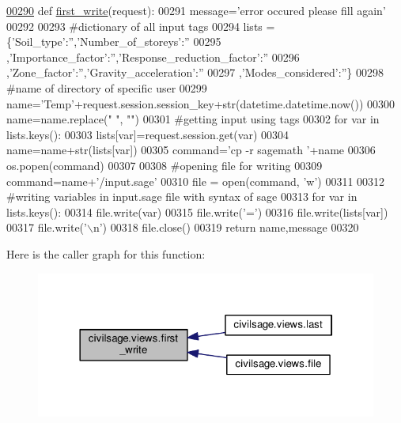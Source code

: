 \begin{DoxyCode}
\hypertarget{namespacecivilsage_1_1views_l00290}{}\hyperlink{namespacecivilsage_1_1views_ad9397359f36a9df37e0aa43f3be032a3}{00290} \textcolor{keyword}{def }\hyperlink{namespacecivilsage_1_1views_ad9397359f36a9df37e0aa43f3be032a3}{first\_write}(request):
00291     message=\textcolor{stringliteral}{'error occured please fill again'}
00292 
00293     \textcolor{comment}{#dictionary of all input tags}
00294     lists = \{\textcolor{stringliteral}{'Soil\_type'}:\textcolor{stringliteral}{''},\textcolor{stringliteral}{'Number\_of\_storeys'}:\textcolor{stringliteral}{''}
00295     ,\textcolor{stringliteral}{'Importance\_factor'}:\textcolor{stringliteral}{''},\textcolor{stringliteral}{'Response\_reduction\_factor'}:\textcolor{stringliteral}{''}
00296     ,\textcolor{stringliteral}{'Zone\_factor'}:\textcolor{stringliteral}{''},\textcolor{stringliteral}{'Gravity\_acceleration'}:\textcolor{stringliteral}{''}
00297     ,\textcolor{stringliteral}{'Modes\_considered'}:\textcolor{stringliteral}{''}\}
00298     \textcolor{comment}{#name of directory of specific user}
00299     name=\textcolor{stringliteral}{'Temp'}+request.session.session\_key+str(datetime.datetime.now())
00300     name=name.replace(\textcolor{stringliteral}{" "}, \textcolor{stringliteral}{""})
00301     \textcolor{comment}{#getting input using tags}
00302     \textcolor{keywordflow}{for} var \textcolor{keywordflow}{in} lists.keys():
00303         lists[var]=request.session.get(var)
00304         name=name+str(lists[var])
00305     command=\textcolor{stringliteral}{'cp -r sagemath '}+name
00306     os.popen(command)
00307 
00308     \textcolor{comment}{#opening file for writing}
00309     command=name+\textcolor{stringliteral}{'/input.sage'}
00310     file = open(command, \textcolor{stringliteral}{'w'})
00311 
00312     \textcolor{comment}{#writing variables in input.sage file with syntax of sage}
00313     \textcolor{keywordflow}{for} var \textcolor{keywordflow}{in} lists.keys():
00314         file.write(var)
00315         file.write(\textcolor{stringliteral}{'='})
00316         file.write(lists[var])
00317         file.write(\textcolor{stringliteral}{'\(\backslash\)n'})
00318     file.close()
00319     \textcolor{keywordflow}{return} name,message
00320 \end{DoxyCode}


Here is the caller graph for this function\+:\nopagebreak
\begin{figure}[H]
\begin{center}
\leavevmode
\includegraphics[width=322pt]{namespacecivilsage_1_1views_ad9397359f36a9df37e0aa43f3be032a3_icgraph}
\end{center}
\end{figure}


